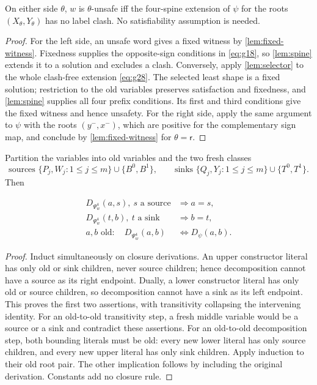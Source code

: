 \begin{theorem}\label{thm:four-spine}
On either side $\theta$, $w$ is $\theta$-unsafe iff the four-spine extension
of $\psi$ for the roots $(X_\theta,Y_\theta)$ has no label clash. No
satisfiability assumption is needed.
\end{theorem}
\begin{proof}
For the left side, an unsafe word gives a fixed witness by
\cref{lem:fixed-witness}. Fixedness supplies the opposite-sign conditions
in \eqref{eq:g18}, so \cref{lem:spine} extends it to a solution and excludes
a clash. Conversely, apply \cref{lem:selector} to the whole clash-free
extension \eqref{eq:g28}. The selected least shape is a fixed solution;
restriction to the old variables preserves satisfaction and fixedness,
and \cref{lem:spine} supplies all four prefix conditions. Its first and
third conditions give the fixed witness and hence unsafety.
For the right side, apply the same argument to $\psi$ with the roots
$(y^-,x^-)$, which are positive for the complementary sign map, and conclude
by \cref{lem:fixed-witness} for $\theta=\mathsf r$.
\end{proof}

\begin{lemma}[Separation]\label{lem:separation}
Partition the variables into old variables and the two fresh classes
\[
 \text{sources }\{P_j,W_j:1\le j\le m\}\cup\{B^0,B^1\},\qquad
 \text{sinks }\{Q_j,Y_j:1\le j\le m\}\cup\{T^0,T^1\}.
\]
Then

\begin{equation}\label{eq:g30}
\begin{array}{ll}
 D_{\Psi^4_w}(a,s),\ s\text{ a source}&\Longrightarrow a=s,\\
 D_{\Psi^4_w}(t,b),\ t\text{ a sink}&\Longrightarrow b=t,\\
 a,b\text{ old}:\quad D_{\Psi^4_w}(a,b)&\Longleftrightarrow D_\psi(a,b).
 \end{array}
\end{equation}

\end{lemma}

\begin{proof} Induct simultaneously on closure derivations.
An upper constructor literal has only old or sink children, never source
children; hence decomposition cannot have a source as its right endpoint.
Dually, a lower constructor literal has only old or source children, so
decomposition cannot have a sink as its left endpoint. This proves the
first two assertions, with transitivity collapsing the intervening identity.
For an old-to-old transitivity step, a fresh middle variable would be a source
or a sink and contradict these assertions. For an old-to-old decomposition
step, both bounding literals must be old: every new lower literal has only
source children, and every new upper literal has only sink children.
Apply induction to their old root pair. The other implication follows by
including the original derivation. Constants add no closure rule. \end{proof}

